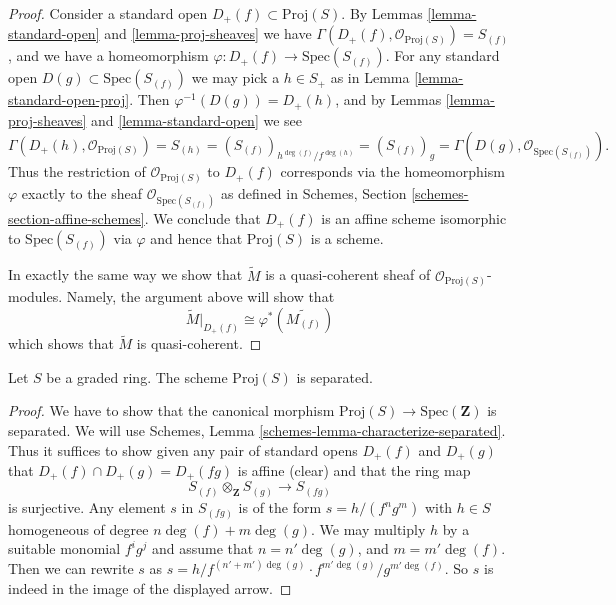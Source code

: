 \begin{proof}
Consider a standard open $D_{+}(f) \subset \text{Proj}(S)$.
By Lemmas \ref{lemma-standard-open} and \ref{lemma-proj-sheaves}
we have $\Gamma(D_{+}(f), \mathcal{O}_{\text{Proj}(S)}) = S_{(f)}$, and
we have a homeomorphism $\varphi : D_{+}(f) \to \text{Spec}(S_{(f)})$.
For any standard open $D(g) \subset \text{Spec}(S_{(f)})$ we may
pick a $h \in S_{+}$ as in Lemma \ref{lemma-standard-open-proj}.
Then $\varphi^{-1}(D(g)) = D_{+}(h)$, and by
Lemmas \ref{lemma-proj-sheaves} and \ref{lemma-standard-open} we see
$$
\Gamma(D_{+}(h), \mathcal{O}_{\text{Proj}(S)})
=
S_{(h)}
=
(S_{(f)})_{h^{\deg(f)}/f^{\deg(h)}}
=
(S_{(f)})_g
=
\Gamma(D(g), \mathcal{O}_{\text{Spec}(S_{(f)})}).
$$
Thus the restriction of $\mathcal{O}_{\text{Proj}(S)}$ to
$D_{+}(f)$ corresponds via the homeomorphism $\varphi$
exactly to the sheaf $\mathcal{O}_{\text{Spec}(S_{(f)})}$
as defined in Schemes, Section \ref{schemes-section-affine-schemes}.
We conclude that $D_{+}(f)$ is an affine scheme isomorphic to
$\text{Spec}(S_{(f)})$ via $\varphi$ and
hence that $\text{Proj}(S)$ is a scheme.

\medskip\noindent
In exactly the same way we show that $\widetilde M$ is a
quasi-coherent sheaf of $\mathcal{O}_{\text{Proj}(S)}$-modules.
Namely, the argument above will show that
$$
\widetilde M|_{D_{+}(f)} \cong \varphi^*\left(\widetilde{M_{(f)}}\right)
$$
which shows that $\widetilde M$ is quasi-coherent.
\end{proof}

\begin{lemma}
\label{lemma-proj-separated}
Let $S$ be a graded ring.
The scheme $\text{Proj}(S)$ is separated.
\end{lemma}

\begin{proof}
We have to show that the canonical morphism
$\text{Proj}(S) \to \text{Spec}(\mathbf{Z})$
is separated.
We will use Schemes, Lemma \ref{schemes-lemma-characterize-separated}.
Thus it suffices to show given any pair of standard opens
$D_{+}(f)$ and $D_{+}(g)$ that $D_{+}(f) \cap D_{+}(g) = D_{+}(fg)$
is affine (clear) and that the ring map
$$
S_{(f)} \otimes_{\mathbf{Z}} S_{(g)} \longrightarrow S_{(fg)}
$$
is surjective. Any element $s$ in $S_{(fg)}$ is of
the form $s = h/(f^ng^m)$ with $h \in S$ homogeneous of degree
$n\deg(f) + m\deg(g)$. We may multiply $h$ by a suitable
monomial $f^ig^j$ and assume that $n = n' \deg(g)$, and
$m = m' \deg(f)$. Then we can rewrite $s$ as
$s = h/f^{(n' + m')\deg(g)} \cdot f^{m'\deg(g)}/g^{m'\deg(f)}$.
So $s$ is indeed in the image of the displayed arrow.
\end{proof}

